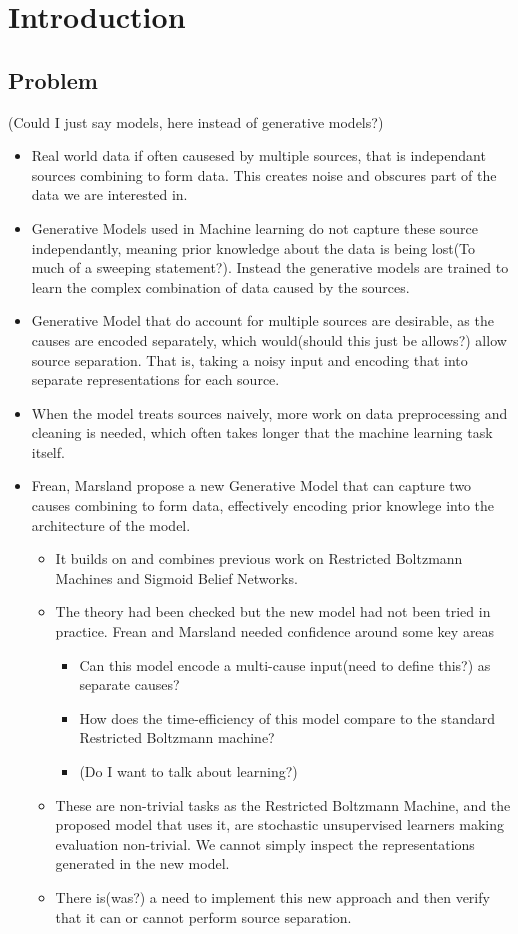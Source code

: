 \chapter{Introduction}

\section{Problem}
(Could I just say models, here instead of generative models?)
\begin{itemize}
  \item Real world data if often causesed by multiple sources, that is independant sources combining to form data.  This creates noise and obscures part of the data we are interested in.
  \item Generative Models used in Machine learning do not capture these source independantly, meaning prior knowledge about the data is being lost(To much of a sweeping statement?). Instead the generative models are trained to learn the complex combination of data caused by the sources.
  \item Generative Model that do account for multiple sources are desirable, as the causes are encoded separately, which would(should this just be allows?) allow source separation. That is, taking a noisy input and encoding that into separate representations for each source.
  \item When the model treats sources naively, more work on data preprocessing and cleaning is needed, which often takes longer that the machine learning task itself.
  \item Frean, Marsland propose a new Generative Model that can capture two causes combining to form data, effectively encoding prior knowlege into the architecture of the model.
  \begin{itemize}
    \item It builds on and combines previous work on Restricted Boltzmann Machines and Sigmoid Belief Networks.
    \item The theory had been checked but the new model had not been tried in practice. Frean and Marsland needed confidence around some key areas
    \begin{itemize}
      \item Can this model encode a multi-cause input(need to define this?) as separate causes?
      \item How does the time-efficiency of this model compare to the standard Restricted Boltzmann machine?
      \item (Do I want to talk about learning?)
    \end{itemize}
    \item These are non-trivial tasks as the Restricted Boltzmann Machine, and the proposed model that uses it, are stochastic unsupervised learners making evaluation non-trivial. We cannot simply inspect the representations generated in the new model.
    \item There is(was?) a need to implement this new approach and then verify that it can or cannot perform source separation.
  \end{itemize}
\end{itemize}

